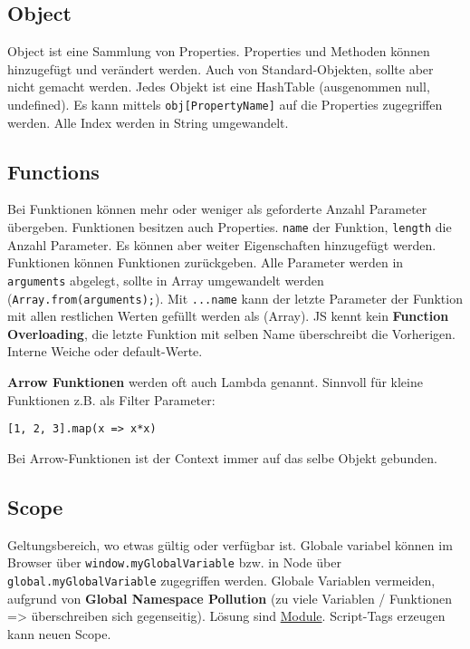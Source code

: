 \documentclass[11pt,twoside,landscape]{article}
\begin{document}
\begin{multicols}{4}
\subsection{Object}
\label{sec:orgafa2985}
Object ist eine Sammlung von Properties. Properties und Methoden können hinzugefügt und verändert werden. Auch von Standard-Objekten, sollte aber nicht gemacht werden. Jedes Objekt ist eine HashTable (ausgenommen null, undefined). Es kann mittels \texttt{obj[PropertyName]} auf die Properties zugegriffen werden. Alle Index werden in String umgewandelt.

\subsection{Functions}
\label{sec:org05ed87b}
Bei Funktionen können mehr oder weniger als geforderte Anzahl Parameter übergeben. Funktionen besitzen auch Properties. \texttt{name} der Funktion, \texttt{length} die Anzahl Parameter. Es können aber weiter Eigenschaften hinzugefügt werden. Funktionen können Funktionen zurückgeben. Alle Parameter werden in \texttt{arguments} abgelegt, sollte in Array umgewandelt werden (\texttt{Array.from(arguments);}). Mit \texttt{...name} kann der letzte Parameter der Funktion mit allen restlichen Werten gefüllt werden als (Array).
JS kennt kein \textbf{Function Overloading}, die letzte Funktion mit selben Name überschreibt die Vorherigen. Interne Weiche oder default-Werte.

\textbf{Arrow Funktionen} werden oft auch Lambda genannt. Sinnvoll für kleine Funktionen z.B. als Filter Parameter:
\lstset{language=js,label= ,caption= ,captionpos=b,numbers=none}
\begin{lstlisting}
[1, 2, 3].map(x => x*x)
\end{lstlisting}
Bei Arrow-Funktionen ist der Context immer auf das selbe Objekt gebunden.

\subsection{Scope}
\label{sec:org3ee101a}
Geltungsbereich, wo etwas gültig oder verfügbar ist. Globale variabel können im Browser über \texttt{window.myGlobalVariable} bzw. in Node über \texttt{global.myGlobalVariable} zugegriffen werden. Globale Variablen vermeiden, aufgrund von \textbf{Global Namespace Pollution} (zu viele Variablen / Funktionen => überschreiben sich gegenseitig). Lösung sind \hyperref[sec:org009fe7e]{Module}. Script-Tags erzeugen kann neuen Scope.


\end{multicols}
\end{document}
